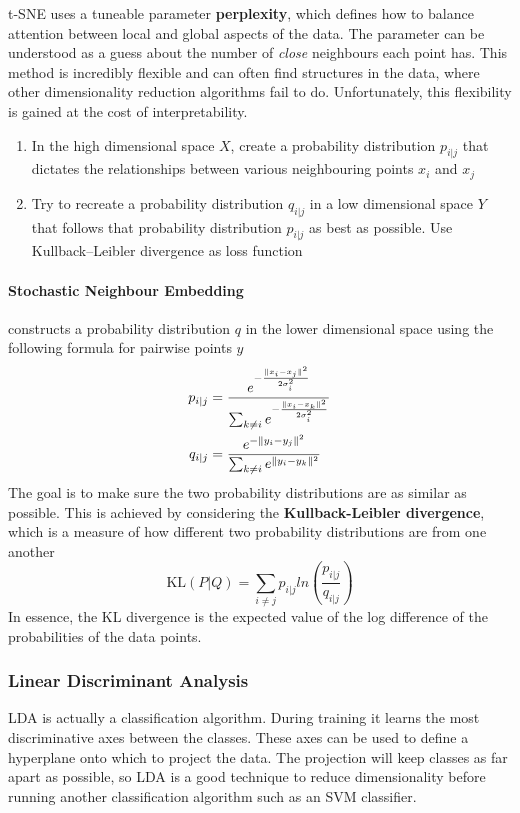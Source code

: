 \documentclass[11pt]{article}
\theoremstyle{definition}
\DeclarePairedDelimiter\norm{\lVert}{\rVert}
\begin{document}
t-SNE uses a tuneable parameter \textbf{perplexity}, which defines how to balance attention between local and global aspects of the data. The parameter can be understood as a guess about the number of \emph{close} neighbours each point has. This method is incredibly flexible and can often find structures in the data, where other dimensionality reduction algorithms fail to do. Unfortunately, this flexibility is gained at the cost of interpretability.

\begin{enumerate}
	\item In the high dimensional space $X$, create a probability distribution $p_{i|j}$ that dictates the relationships between various neighbouring points $x_i$ and $x_j$
	\item Try to recreate a probability distribution $q_{i|j}$ in a low dimensional space $Y$ that follows that probability distribution $p_{i|j}$ as best as possible. Use Kullback–Leibler divergence as loss function
\end{enumerate}

\paragraph{Stochastic Neighbour Embedding} constructs a probability distribution $q$ in the lower dimensional space using the following formula for pairwise points $y$
\begin{align*}
	p_{i|j} &= \frac{e^{-\frac{\norm{x_i - x_j}^2}{2\sigma_i^2}}}{\sum_{k\neq i}e^{-\frac{\norm{x_i - x_k}^2}{2\sigma_i^2}}}\\
	q_{i|j} &= \frac{e^{-\norm{y_i - y_j}^2}}{\sum_{k\neq i}e^{\norm{y_i - y_k}^2}}
\end{align*}
The goal is to make sure the two probability distributions are as similar as possible. This is achieved by considering the \textbf{Kullback-Leibler divergence}, which is a measure of how different two probability distributions are from one another
\begin{equation}
	\text{KL}(P|Q) = \sum_{i\neq j} p_{i|j} ln\left(\frac{p_{i|j}}{q_{i|j}}\right)
\end{equation}
In essence, the KL divergence is the expected value of the log difference of the probabilities of the data points.

\subsubsection{Linear Discriminant Analysis}
LDA is actually a classification algorithm. During training it learns the most discriminative axes between the classes. These axes can be used to define a hyperplane onto which to project the data. The projection will keep classes as far apart as possible, so LDA is a good technique to reduce dimensionality before running another classification algorithm such as an SVM classifier.
\end{document}

